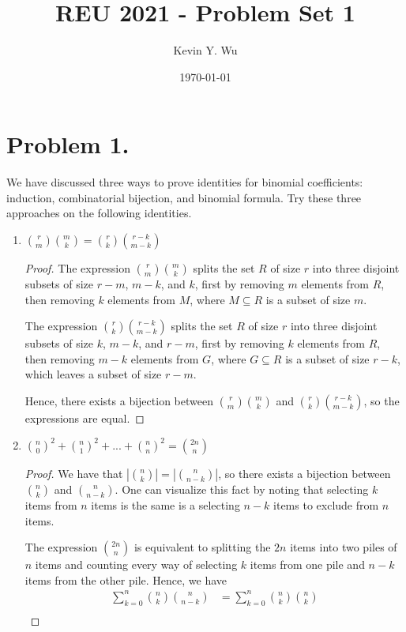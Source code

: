 \documentclass{article}
\title{REU 2021 - Problem Set 1}
\author{Kevin Y. Wu}
\date{\today}
\begin{document}
\maketitle

\tableofcontents
\newpage
{}


\section{Problem 1.}
We have discussed three ways to prove identities for binomial coefficients: induction, combinatorial bijection, and binomial formula. Try these three approaches on the following identities.
\begin{enumerate}[label=(\alph*)]
    \item $\binom{r}{m}\binom{m}{k}=\binom{r}{k}\binom{r-k}{m-k}$ 
    \begin{proof}
    The expression $\binom{r}{m}\binom{m}{k}$ splits the set $R$ of size $r$ into three disjoint subsets of size $r-m$, $m-k$, and $k$, first by removing $m$ elements from $R$, then removing $k$ elements from $M$, where $M \subseteq R$ is a subset of size $m$.
    \par The expression $\binom{r}{k}\binom{r-k}{m-k}$ splits the set $R$ of size $r$ into three disjoint subsets of size $k$, $m-k$, and $r-m$, first by removing $k$ elements from $R$, then removing $m-k$ elements from $G$, where $G \subseteq R$ is a subset of size $r-k$, which leaves a subset of size $r-m$.
    \par Hence, there exists a bijection between $\binom{r}{m}\binom{m}{k}$ and $\binom{r}{k}\binom{r-k}{m-k}$, so the expressions are equal.
    \end{proof}
    \item $\binom{n}{0}^2+\binom{n}{1}^2+...+\binom{n}{n}^2=\binom{2n}{n}$
    \begin{proof}
    We have that $|\binom{n}{k}|=|\binom{n}{n-k}|$, so there exists a bijection between $\binom{n}{k}$ and $\binom{n}{n-k}$. One can visualize this fact by noting that selecting $k$ items from $n$ items is the same is a selecting $n-k$ items to exclude from $n$ items. 
    \par The expression $\binom{2n}{n}$ is equivalent to splitting the $2n$ items into two piles of $n$ items and counting every way of selecting $k$ items from one pile and $n-k$ items from the other pile. Hence, we have
    \begin{align*}
        \sum_{k=0}^{n} \binom{n}{k}\binom{n}{n-k}
        &=\sum_{k=0}^{n}\binom{n}{k}\binom{n}{k}\\

\end{align*}
\end{proof}
\end{enumerate}
\end{document}
